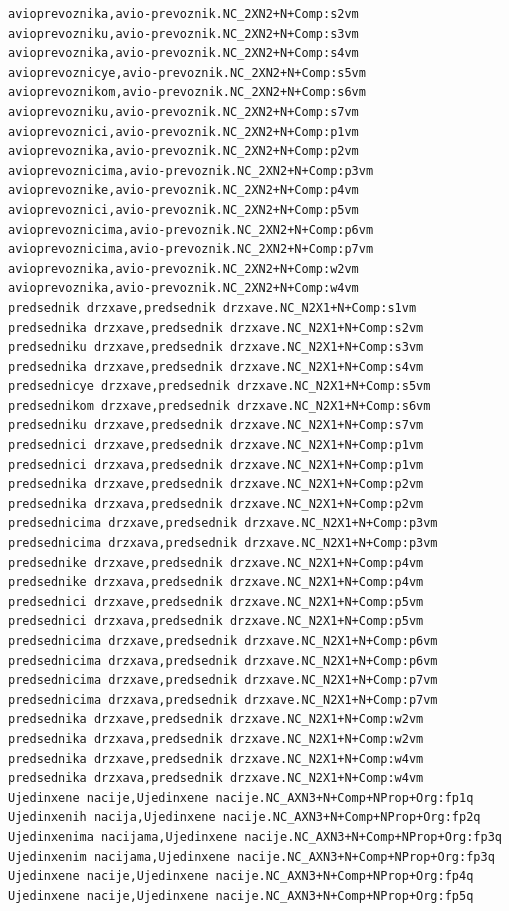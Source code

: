 \begin{verbatim}
avioprevoznika,avio-prevoznik.NC_2XN2+N+Comp:s2vm
avioprevozniku,avio-prevoznik.NC_2XN2+N+Comp:s3vm
avioprevoznika,avio-prevoznik.NC_2XN2+N+Comp:s4vm
avioprevoznicye,avio-prevoznik.NC_2XN2+N+Comp:s5vm
avioprevoznikom,avio-prevoznik.NC_2XN2+N+Comp:s6vm
avioprevozniku,avio-prevoznik.NC_2XN2+N+Comp:s7vm
avioprevoznici,avio-prevoznik.NC_2XN2+N+Comp:p1vm
avioprevoznika,avio-prevoznik.NC_2XN2+N+Comp:p2vm
avioprevoznicima,avio-prevoznik.NC_2XN2+N+Comp:p3vm
avioprevoznike,avio-prevoznik.NC_2XN2+N+Comp:p4vm
avioprevoznici,avio-prevoznik.NC_2XN2+N+Comp:p5vm
avioprevoznicima,avio-prevoznik.NC_2XN2+N+Comp:p6vm
avioprevoznicima,avio-prevoznik.NC_2XN2+N+Comp:p7vm
avioprevoznika,avio-prevoznik.NC_2XN2+N+Comp:w2vm
avioprevoznika,avio-prevoznik.NC_2XN2+N+Comp:w4vm
predsednik drzxave,predsednik drzxave.NC_N2X1+N+Comp:s1vm
predsednika drzxave,predsednik drzxave.NC_N2X1+N+Comp:s2vm
predsedniku drzxave,predsednik drzxave.NC_N2X1+N+Comp:s3vm
predsednika drzxave,predsednik drzxave.NC_N2X1+N+Comp:s4vm
predsednicye drzxave,predsednik drzxave.NC_N2X1+N+Comp:s5vm
predsednikom drzxave,predsednik drzxave.NC_N2X1+N+Comp:s6vm
predsedniku drzxave,predsednik drzxave.NC_N2X1+N+Comp:s7vm
predsednici drzxave,predsednik drzxave.NC_N2X1+N+Comp:p1vm
predsednici drzxava,predsednik drzxave.NC_N2X1+N+Comp:p1vm
predsednika drzxave,predsednik drzxave.NC_N2X1+N+Comp:p2vm
predsednika drzxava,predsednik drzxave.NC_N2X1+N+Comp:p2vm
predsednicima drzxave,predsednik drzxave.NC_N2X1+N+Comp:p3vm
predsednicima drzxava,predsednik drzxave.NC_N2X1+N+Comp:p3vm
predsednike drzxave,predsednik drzxave.NC_N2X1+N+Comp:p4vm
predsednike drzxava,predsednik drzxave.NC_N2X1+N+Comp:p4vm
predsednici drzxave,predsednik drzxave.NC_N2X1+N+Comp:p5vm
predsednici drzxava,predsednik drzxave.NC_N2X1+N+Comp:p5vm
predsednicima drzxave,predsednik drzxave.NC_N2X1+N+Comp:p6vm
predsednicima drzxava,predsednik drzxave.NC_N2X1+N+Comp:p6vm
predsednicima drzxave,predsednik drzxave.NC_N2X1+N+Comp:p7vm
predsednicima drzxava,predsednik drzxave.NC_N2X1+N+Comp:p7vm
predsednika drzxave,predsednik drzxave.NC_N2X1+N+Comp:w2vm
predsednika drzxava,predsednik drzxave.NC_N2X1+N+Comp:w2vm
predsednika drzxave,predsednik drzxave.NC_N2X1+N+Comp:w4vm
predsednika drzxava,predsednik drzxave.NC_N2X1+N+Comp:w4vm
Ujedinxene nacije,Ujedinxene nacije.NC_AXN3+N+Comp+NProp+Org:fp1q
Ujedinxenih nacija,Ujedinxene nacije.NC_AXN3+N+Comp+NProp+Org:fp2q
Ujedinxenima nacijama,Ujedinxene nacije.NC_AXN3+N+Comp+NProp+Org:fp3q
Ujedinxenim nacijama,Ujedinxene nacije.NC_AXN3+N+Comp+NProp+Org:fp3q
Ujedinxene nacije,Ujedinxene nacije.NC_AXN3+N+Comp+NProp+Org:fp4q
Ujedinxene nacije,Ujedinxene nacije.NC_AXN3+N+Comp+NProp+Org:fp5q

\end{verbatim}
